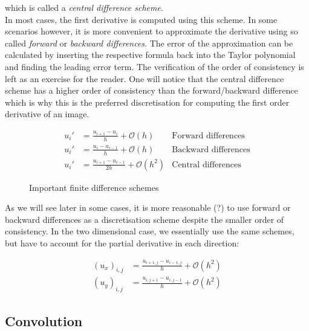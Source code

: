 which is called a \textit{central difference scheme}.\\
In most cases, the first derivative is computed using this scheme. In some scenarios however, it
is more convenient to approximate the derivative using so called \textit{forward} or
\textit{backward differences}.
The error of the approximation can be calculated by inserting the respective formula back into the
Taylor polynomial and finding the leading error term.
The verification of the order of consistency is left as an exercise for the reader.
One will notice that the central difference scheme has a higher order of consistency than the
forward/backward difference which is why this is the preferred discretisation for computing the
first order derivative of an image.

\begin{figure}[h!]
    \begin{align*}
        u_i' &= \frac{u_{i+1} - u_i}{h} + \mathcal{O}(h)  & \text{Forward differences}\\
        u_i' &= \frac{u_{i} - u_{i-1}}{h} + \mathcal{O}(h) & \text{Backward differences}\\
        u_i' &= \frac{u_{i+1} - u_{i-1}}{2h} + \mathcal{O}(h^2) & \text{Central differences}
    \end{align*}
    \caption*{Important finite difference schemes}
\end{figure}


As we will see later in some cases, it is more reasonable (?) to use forward or backward differences as a
discretisation scheme despite the smaller order of consistency.
In the two dimensional case, we essentially use the same schemes, but have to account for the
partial derivative in each direction:

\begin{align*}
    (u_x)_{i, j} &= \frac{u_{i+1, j} - u_{i-1, j}}{h} + \mathcal{O}(h^2)\\
    (u_y)_{i, j} &= \frac{u_{i, j+1} - u_{i, j-1}}{h} + \mathcal{O}(h^2)
\end{align*}

\subsection*{Convolution}

